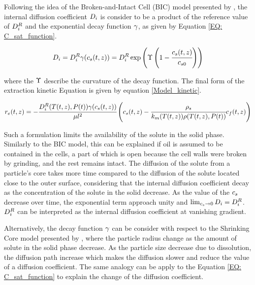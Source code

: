 \documentclass[../Article_Model_Parameters.tex]{subfiles}
\begin{document}
	Following the idea of the Broken-and-Intact Cell (BIC) model presented by \citet{Sovova2017}, the internal diffusion coefficient ${\color{black}D_i}$ is consider to be a product of the reference value of ${\color{black}D_i^R}$ and the exponential decay function ${\color{black} \gamma}$, as given by Equation \ref{EQ: C_sat_function}.
		
	{\footnotesize
		\begin{equation}
			{\color{black}D_i} = {\color{black}D_i^R} {\color{black} \gamma}({\color{black} c_s} (t,z)) = {\color{black}D_i^R} \exp\left( {\color{black}\Upsilon} \left( 1-\cfrac{{\color{black} c_s} (t,z) }{{\color{black}c_{s0}}} \right) \right) \label{EQ: C_sat_function}
		\end{equation} }
	
	where the ${\color{black}\Upsilon}$ describe the curvature of the decay function. The final form of the extraction kinetic Equation is given by equation \ref{Model_kinetic}.
			
	{\scriptsize
		\begin{equation}
			\label{Model_kinetic}
				{\color{black}r_e}(t,z) = -\cfrac{{\color{black}D_i^R}({\color{black}T}(t,z), {\color{black}P}(t)) {\color{black} \gamma}({\color{black} c_s} (t,z)) }{{\color{black} \mu l^2} } \left({\color{black}{\color{black} c_s} }(t,z)  - \cfrac{{\color{black}\rho_s}}{{\color{black}k_m}({\color{black}T}(t,z)){\color{black}\rho}({\color{black}T}(t,z),{\color{black}P}(t))}  {\color{black}c_f}(t,z) \right)
		\end{equation} }
	
	Such a formulation limits the availability of the solute in the solid phase. Similarly to the BIC model, this can be explained if oil is assumed to be contained in the cells, a part of which is open because the cell walls were broken by grinding, and the rest remains intact. The diffusion of the solute from a particle's core takes more time compared to the diffusion of the solute located close to the outer surface, considering that the internal diffusion coefficient decay as the concentration of the solute in the solid decrease. As the value of the ${\color{black}c_s}$ decrease over time, the exponential term approach unity and $\lim_{ {\color{black}c_s} \rightarrow 0} {\color{black}D_i} =  {\color{black}D_i^R}$. ${\color{black}D_i^R}$ can be interpreted as the internal diffusion coefficient at vanishing gradient. 
		
	Alternatively, the decay function ${\color{black}\gamma}$ can be consider with respect to the Shrinking Core model presented by \citet{Goto1996}, where the particle radius change as the amount of solute in the solid phase decrease. As the particle size decrease due to dissolution, the diffusion path increase which makes the diffusion slower and reduce the value of a diffusion coefficient. The same analogy can be apply to the Equation \ref{EQ: C_sat_function} to explain the change of the diffusion coefficient.
		
\end{document}
